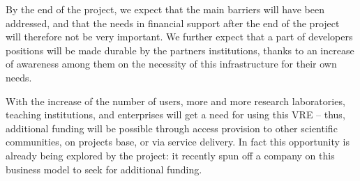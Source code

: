 By the end of the project, we expect that the main barriers will have
been addressed, and that the needs in financial support after the end
of the project will therefore not be very important. We further expect
that a part of developers positions will be made durable by the
partners institutions, thanks to an increase of awareness among them
on the necessity of this infrastructure for their own needs.

With the increase of the number of users, more and more research
laboratories, teaching institutions, and enterprises will get a need
for using this VRE -- thus, additional funding will be possible
through access provision to other scientific communities, on projects
base, or via service delivery. In fact this opportunity is already
being explored by the \SMC project: it recently spun off a company on
this business model to seek for additional funding.








